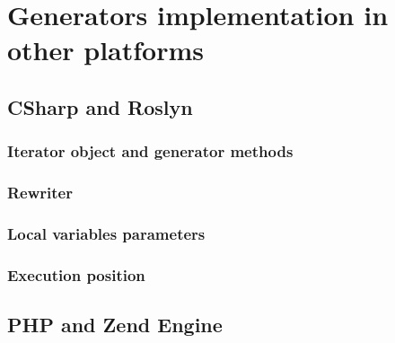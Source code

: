 \chapter{Generators implementation in other platforms}

\section{CSharp and Roslyn}

\subsection{Iterator object and generator methods}

\subsection{Rewriter}

\subsection{Local variables parameters}

\subsection{Execution position}

\section{PHP and Zend Engine}